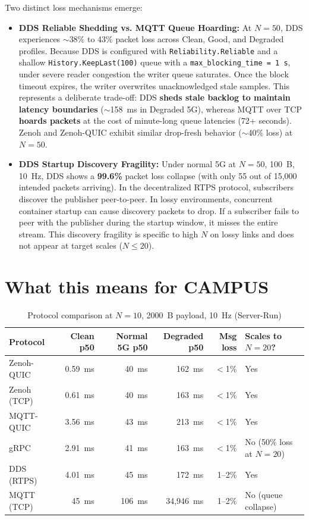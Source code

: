 \documentclass[11pt,a4paper]{article}
\begin{document}
Two distinct loss mechanisms emerge:
\begin{itemize}
    \item \textbf{DDS Reliable Shedding vs. MQTT Queue Hoarding:} 
    At $N=50$, DDS experiences $\sim$38\% to 43\% packet loss across Clean, Good, and Degraded profiles. Because DDS is configured with \texttt{Reliability.Reliable} and a shallow \texttt{History.KeepLast(100)} queue with a \texttt{max\_blocking\_time = 1~s}, under severe reader congestion the writer queue saturates. Once the block timeout expires, the writer overwrites unacknowledged stale samples. 
    This represents a deliberate trade-off: DDS \textbf{sheds stale backlog to maintain latency boundaries} ($\sim$158~ms in Degraded 5G), whereas MQTT over TCP \textbf{hoards packets} at the cost of minute-long queue latencies (72+ seconds). Zenoh and Zenoh-QUIC exhibit similar drop-fresh behavior ($\sim$40\% loss) at $N=50$.
    
    \item \textbf{DDS Startup Discovery Fragility:}
    Under normal 5G at $N=50$, 100~B, 10~Hz, DDS shows a \textbf{99.6\%} packet loss collapse (with only 55 out of 15,000 intended packets arriving). In the decentralized RTPS protocol, subscribers discover the publisher peer-to-peer. In lossy environments, concurrent container startup can cause discovery packets to drop. If a subscriber fails to peer with the publisher during the startup window, it misses the entire stream. This discovery fragility is specific to high $N$ on lossy links and does not appear at target scales ($N \le 20$).
\end{itemize}

\section{What this means for CAMPUS}

\begin{table}[H]
\centering
\caption{Protocol comparison at $N=10$, 2000~B payload, 10~Hz (Server-Run)}
\label{tab:summary}
\begin{tabular}{lrrrrl}
\toprule
Protocol & Clean p50 & Normal 5G p50 & Degraded p50 & Msg loss & Scales to $N=20$? \\
\midrule
Zenoh-QUIC  & 0.59~ms & 40~ms & 162~ms       & $<$1\%   & Yes \\
Zenoh (TCP) & 0.61~ms & 40~ms & 163~ms       & $<$1\%   & Yes \\
MQTT-QUIC   & 3.56~ms & 43~ms & 213~ms       & $<$1\%   & Yes \\
gRPC        & 2.91~ms & 41~ms & 163~ms       & $<$1\%   & No (50\% loss at $N=20$) \\
DDS (RTPS)  & 4.01~ms & 45~ms & 172~ms       & 1--2\%   & Yes \\
MQTT (TCP)  & 45~ms   & 106~ms & 34{,}946~ms  & 1--2\%   & No (queue collapse) \\
\bottomrule
\end{tabular}
\end{table}
\end{document}
